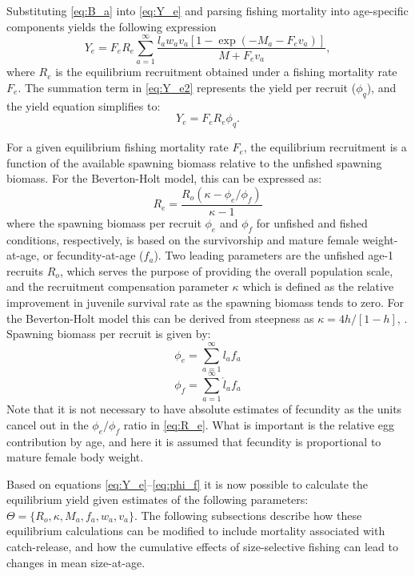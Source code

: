 Substituting \eqref{eq:B_a} into  \eqref{eq:Y_e} and parsing fishing mortality into age-specific components yields the following expression
\begin{equation}\label{eq:Y_e2}
	Y_e = F_e R_e \sum_{a=1}^\infty \frac{l_a w_a v_a [1-\exp(-M_a-F_e v_a)]}{M+F_e v_a},
\end{equation}
where $R_e$ is the equilibrium recruitment obtained under a fishing mortality rate $F_e$. The summation term in \eqref{eq:Y_e2} represents the yield per recruit ($\phi_q$), and the yield equation simplifies to:
\begin{equation}\label{eq:Y_e3}
	Y_e = F_e R_e \phi_q.
\end{equation}

For a given equilibrium fishing mortality rate $F_e$, the equilibrium recruitment is a function of the available spawning biomass relative to the unfished spawning biomass. For the Beverton-Holt model, this can be expressed as:
\begin{equation}\label{eq:R_e}
	R_e = \frac{R_o (\kappa-\phi_e/\phi_f)}{\kappa -1} 
\end{equation}
where the spawning biomass per recruit $\phi_e$ and $\phi_f$ for unfished and fished conditions, respectively, is based on the survivorship and mature female weight-at-age,  or fecundity-at-age ($f_a$).  Two leading parameters are the unfished age-1 recruits $R_o$, which serves the purpose of providing the overall population scale, and the recruitment compensation parameter $\kappa$ which is defined as the relative improvement in juvenile survival rate as the spawning biomass tends to zero. For the Beverton-Holt model this can be derived from steepness as $\kappa= 4h/[1-h]$, \citep[see][for further details]{Martell2008pam}.  Spawning biomass per recruit is given by:
\begin{equation}
	\phi_e = \sum_{a=1}^\infty l_a f_a\label{eq:phi_e}
\end{equation}
\begin{equation}
	\phi_f = \sum_{a=1}^\infty \acute{l}_a f_a\label{eq:phi_f}
\end{equation}
Note that it is not necessary to have absolute estimates of fecundity as the units cancel out in the $\phi_e/\phi_f$ ratio in \eqref{eq:R_e}. What is important is the relative egg contribution by age, and here it is assumed that fecundity is proportional to mature female body weight.

Based on equations \ref{eq:Y_e}--\ref{eq:phi_f} it is now possible to calculate the equilibrium yield given estimates of the following parameters: $\Theta = \{R_o, \kappa, M_a, f_a, w_a, v_a\}$.  The following subsections describe how these equilibrium calculations can be modified to include mortality associated with catch-release, and how the cumulative effects of size-selective fishing can lead to changes in mean size-at-age.

